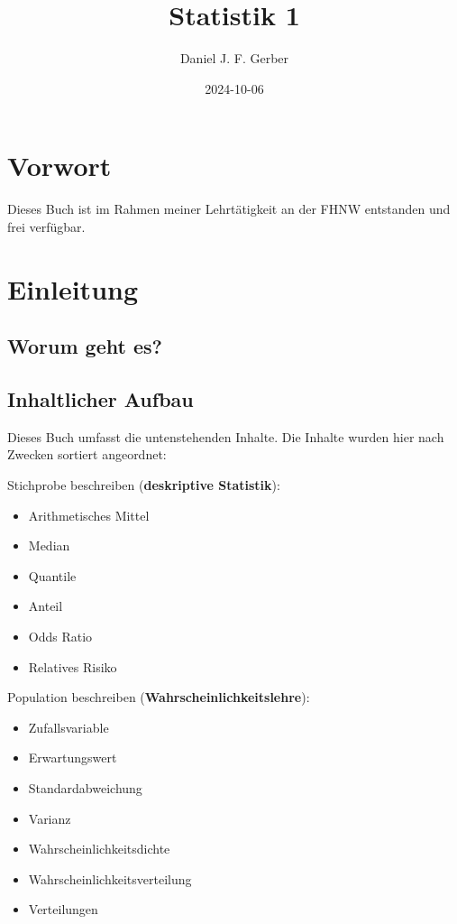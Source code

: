 \documentclass[
]{book}
\title{Statistik 1}
\author{Daniel J. F. Gerber}
\date{2024-10-06}
\providecommand{\tightlist}{%
  \setlength{\itemsep}{0pt}\setlength{\parskip}{0pt}}
\theoremstyle{definition}
\theoremstyle{definition}
\theoremstyle{definition}
\theoremstyle{definition}
\theoremstyle{remark}
\begin{document}
\maketitle

{
\setcounter{tocdepth}{1}
\tableofcontents
}
\chapter*{Vorwort}\label{vorwort}

Dieses Buch ist im Rahmen meiner Lehrtätigkeit an der FHNW entstanden und frei verfügbar.

\chapter{Einleitung}\label{einleitung}

\section{Worum geht es?}\label{worum-geht-es}

\section{Inhaltlicher Aufbau}\label{inhaltlicher-aufbau}

Dieses Buch umfasst die untenstehenden Inhalte. Die Inhalte wurden hier nach Zwecken sortiert angeordnet:

Stichprobe beschreiben (\textbf{deskriptive Statistik}):

\begin{itemize}
\tightlist
\item
  Arithmetisches Mittel
\item
  Median
\item
  Quantile
\item
  Anteil
\item
  Odds Ratio
\item
  Relatives Risiko
\end{itemize}

Population beschreiben (\textbf{Wahrscheinlichkeitslehre}):

\begin{itemize}
\tightlist
\item
  Zufallsvariable
\item
  Erwartungswert
\item
  Standardabweichung
\item
  Varianz
\item
  Wahrscheinlichkeitsdichte
\item
  Wahrscheinlichkeitsverteilung
\item
  Verteilungen
\end{itemize}
\end{document}
